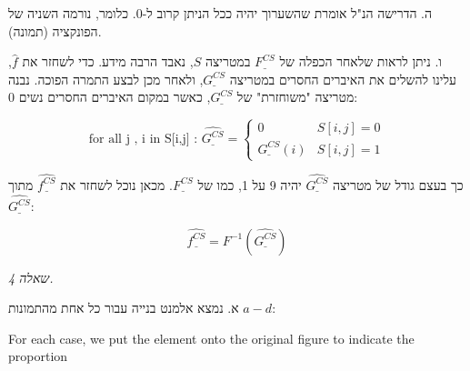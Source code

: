 \documentclass[a4paper]{iacas}
\begin{document}
\begin{hebrew}
ה. הדרישה הנ"ל אומרת שהשערוך יהיה ככל הניתן קרוב ל-0. כלומר, נורמה השניה של הפונקציה (תמונה). 
\end{hebrew}

\newcommand{\FCS}{\underline{F^{CS}}}
\newcommand{\GCS}{\underline{G^{CS}}}
\newcommand{\GCSH}{\hat{\underline{G^{CS}}}}
\newcommand{\fcsh}{\hat{\underline{f^{CS}}}}

\begin{hebrew}
ו. ניתן לראות שלאחר הכפלה של $\FCS$ במטריצה $S$, נאבד הרבה מידע. כדי לשחזר את $\hat{f}$, עלינו להשלים את האיברים החסרים במטריצה $\GCS$, ולאחר מכן לבצע התמרה הפוכה. נבנה מטריצה "משוחזרת" של $\GCS$, כאשר במקום האיברים החסרים נשים 0:
\end{hebrew}
\begin{equation*}
\text{for all j , i in S[i,j] : }
\GCSH = 
\begin{cases}
0  & S [i,j] = 0 \\
\GCS(i) & S [i,j] = 1
\end{cases}
\end{equation*}

\begin{hebrew}
כך בעצם גודל של מטריצה $\GCSH$ יהיה 9 על 1, כמו של $\FCS$. מכאן נוכל לשחזר את $\fcsh$ מתוך $\GCSH$:
\end{hebrew}
\begin{equation*}
\fcsh = F^{-1}(\GCSH)
\end{equation*}



\newpage

\begin{hebrew}
\textit{\huge שאלה 4.}

א. נמצא אלמנט בנייה עבור כל אחת מהתמונות $a-d$:
\end{hebrew}

For each case, we put the element onto the original figure to indicate the proportion
\end{document}
